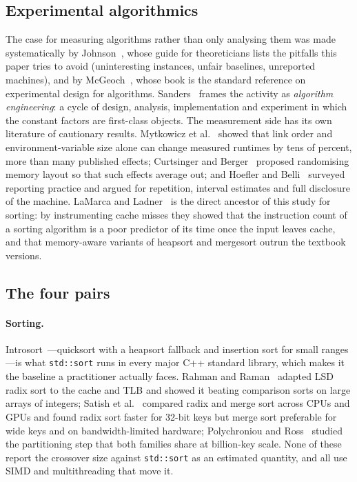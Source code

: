 \subsection{Experimental algorithmics}
The case for measuring algorithms rather than only analysing them was made
systematically by Johnson~\cite{johnson2002theoretician}, whose guide for
theoreticians lists the pitfalls this paper tries to avoid (uninteresting
instances, unfair baselines, unreported machines), and by
McGeoch~\cite{mcgeoch2012guide}, whose book is the standard reference on
experimental design for algorithms. Sanders~\cite{sanders2009algorithm} frames
the activity as \emph{algorithm engineering}: a cycle of design, analysis,
implementation and experiment in which the constant factors are first-class
objects. The measurement side has its own literature of cautionary results.
Mytkowicz et al.~\cite{mytkowicz2009producing} showed that link order and
environment-variable size alone can change measured runtimes by tens of
percent, more than many published effects; Curtsinger and
Berger~\cite{curtsinger2013stabilizer} proposed randomising memory layout so
that such effects average out; and Hoefler and Belli~\cite{hoefler2015scientific}
surveyed reporting practice and argued for repetition, interval estimates and
full disclosure of the machine. LaMarca and Ladner~\cite{lamarca1999influence}
is the direct ancestor of this study for sorting: by instrumenting cache
misses they showed that the instruction count of a sorting algorithm is a poor
predictor of its time once the input leaves cache, and that memory-aware
variants of heapsort and mergesort outrun the textbook versions.

\subsection{The four pairs}
\paragraph{Sorting.}
Introsort~\cite{musser1997introspective}---quicksort with a heapsort fallback
and insertion sort for small ranges---is what \texttt{std::sort} runs in every
major C++ standard library, which makes it the baseline a practitioner actually
faces. Rahman and Raman~\cite{rahman2001adapting} adapted LSD radix sort to the
cache and TLB and showed it beating comparison sorts on large arrays of
integers; Satish et al.~\cite{satish2010fast} compared radix and merge sort
across CPUs and GPUs and found radix sort faster for 32-bit keys but merge sort
preferable for wide keys and on bandwidth-limited hardware; Polychroniou and
Ross~\cite{polychroniou2014comprehensive} studied the partitioning step that
both families share at billion-key scale. None of these report the crossover
size against \texttt{std::sort} as an estimated quantity, and all use SIMD
and multithreading that move it.

